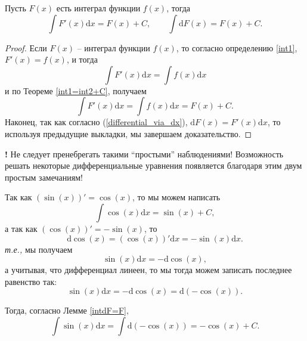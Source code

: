 \begin{lemma}\label{intdF=F}
    Пусть $F(x)$ есть интеграл функции $f(x)$, тогда
    \[
     \int F'(x) \mathrm{d}x = F(x) +C, \qquad \int \mathrm{d}F(x) = F(x) + C.
    \]
\end{lemma}
\begin{proof}
    Если $F(x)$ -- интеграл функции $f(x)$, то согласно определению \ref{int1}, $F'(x) = f(x)$, и тогда
    \[
      \int F'(x) \mathrm{d}x = \int f(x) \mathrm{d}x
    \]
    и по Теореме \ref{int1=int2+C}, получаем
    \[
      \int F'(x) \mathrm{d}x = \int f(x) \mathrm{d}x =  F(x) +C.
    \]
Наконец, так как согласно (\ref{differential_via_dx}), $\mathrm{d}F(x)  = F'(x) \mathrm{d}x$, то используя предыдущие выкладки, мы завершаем доказательство.
\end{proof}

\begin{mydanger}{\bf{!}}
    Не следует пренебрегать такими ``простыми'' наблюдениями! Возможность решать некоторые дифференциальные уравнения появляется благодаря этим двум простым замечаниям! 
\end{mydanger}

\begin{example}
    Так как $(\sin (x))' = \cos(x)$, то мы можем написать
    \[
     \int \cos(x) \mathrm{d}x = \sin(x) +C,
    \]
а так как $(\cos (x))' = -\sin(x)$, то 
\[
 \mathrm{d} \cos(x) =  (\cos (x))'\mathrm{d}x = - \sin(x) \mathrm{d}x.
\]
\textit{т.е.,} мы получаем
\[
 \sin(x) \mathrm{d}x = - \mathrm{d} \cos(x),
 \]
а учитывая, что дифференциал линеен, то мы тогда можем записать последнее равенство так:
\[
 \sin(x) \mathrm{d}x = - \mathrm{d} \cos(x) = \mathrm{d}(-\cos(x)).
 \]
 
Тогда, согласно Лемме \ref{intdF=F},
\[
 \int \sin(x) \mathrm{d}x = \int  \mathrm{d}(-\cos(x)) = -\cos(x) + C.
\]
\end{example}

